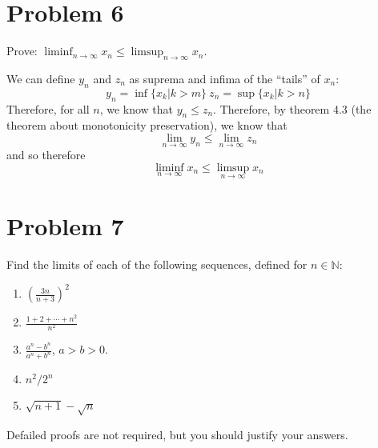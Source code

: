 \documentclass[10pt]{article}
\begin{document}
    \pagebreak

    \section*{Problem 6} 
    Prove: $\liminf_{n \to \infty} x_n \le \limsup_{n \to \infty} x_n$.

    \begin{solution}
        We can define $y_n$ and $z_n$ as suprema and infima of the ``tails'' of $x_n$: 
        \[ y_n = \inf\{x_k | k > m\} \ z_n = \sup\{ x_k | k > n\}\]
        Therefore, for all $n$, we know that $y_n \le z_n$. Therefore, by theorem 4.3 (the theorem about monotonicity preservation), we know that 
        \[ \lim_{n \to \infty} y_n \le \lim_{n \to \infty} z_n\]
        and so therefore
        \[ \liminf_{n \to \infty} x_n \le \limsup_{n \to \infty} x_n\]
    \end{solution}

    \pagebreak

    \section*{Problem 7}
    Find the limits of each of the following sequences, defined for $n \in \mathbb N$: 
    \begin{enumerate}[label=(\alph*)]
        \item $\left(\frac{3n}{n+3}\right)^2$
        \item $\frac{1 + 2 + \cdots + n^2}{n^2}$
        \item $\frac{a^n - b^n}{a^n + b^n}$, $a > b > 0$.
        \item $n^2/2^n$
        \item $\sqrt{n+1} - \sqrt{n}$
    \end{enumerate}
    Defailed proofs are not required, but you should justify your answers.
\end{document}
